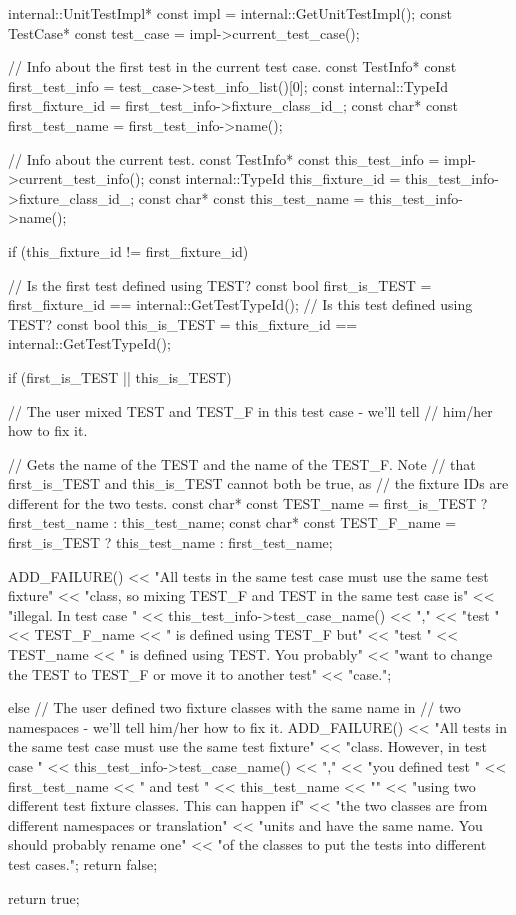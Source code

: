 \begin{DoxyCode}
                               {
  internal::UnitTestImpl* const impl = internal::GetUnitTestImpl();
  const TestCase* const test_case = impl->current_test_case();

  // Info about the first test in the current test case.
  const TestInfo* const first_test_info = test_case->test_info_list()[0];
  const internal::TypeId first_fixture_id = first_test_info->fixture_class_id_;
  const char* const first_test_name = first_test_info->name();

  // Info about the current test.
  const TestInfo* const this_test_info = impl->current_test_info();
  const internal::TypeId this_fixture_id = this_test_info->fixture_class_id_;
  const char* const this_test_name = this_test_info->name();

  if (this_fixture_id != first_fixture_id) {
    // Is the first test defined using TEST?
    const bool first_is_TEST = first_fixture_id == internal::GetTestTypeId();
    // Is this test defined using TEST?
    const bool this_is_TEST = this_fixture_id == internal::GetTestTypeId();

    if (first_is_TEST || this_is_TEST) {
      // The user mixed TEST and TEST_F in this test case - we'll tell
      // him/her how to fix it.

      // Gets the name of the TEST and the name of the TEST_F.  Note
      // that first_is_TEST and this_is_TEST cannot both be true, as
      // the fixture IDs are different for the two tests.
      const char* const TEST_name =
          first_is_TEST ? first_test_name : this_test_name;
      const char* const TEST_F_name =
          first_is_TEST ? this_test_name : first_test_name;

      ADD_FAILURE()
          << "All tests in the same test case must use the same test fixture\n"
          << "class, so mixing TEST_F and TEST in the same test case is\n"
          << "illegal.  In test case " << this_test_info->test_case_name()
          << ",\n"
          << "test " << TEST_F_name << " is defined using TEST_F but\n"
          << "test " << TEST_name << " is defined using TEST.  You probably\n"
          << "want to change the TEST to TEST_F or move it to another test\n"
          << "case.";
    } else {
      // The user defined two fixture classes with the same name in
      // two namespaces - we'll tell him/her how to fix it.
      ADD_FAILURE()
          << "All tests in the same test case must use the same test fixture\n"
          << "class.  However, in test case "
          << this_test_info->test_case_name() << ",\n"
          << "you defined test " << first_test_name
          << " and test " << this_test_name << "\n"
          << "using two different test fixture classes.  This can happen if\n"
          << "the two classes are from different namespaces or translation\n"
          << "units and have the same name.  You should probably rename one\n"
          << "of the classes to put the tests into different test cases.";
    }
    return false;
  }

  return true;
}
\end{DoxyCode}
